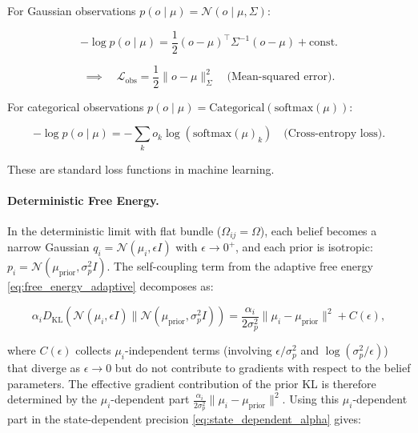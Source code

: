 \documentclass[twoside,11pt]{article}
\begin{document}
For Gaussian observations $p(o \mid \mu) = \mathcal{N}(o \mid \mu, \Sigma)$:

\begin{equation}
-\log p(o \mid \mu) = \frac{1}{2}(o - \mu)^\top \Sigma^{-1} (o - \mu) + \text{const.}
\end{equation}

\begin{equation}
\implies \quad \mathcal{L}_{\text{obs}} = \frac{1}{2}\|o - \mu\|^2_{\Sigma} \quad \text{(Mean-squared error)}.
\end{equation}

For categorical observations $p(o \mid \mu) = \mathrm{Categorical}(\mathrm{softmax}(\mu))$:

\begin{equation}
-\log p(o \mid \mu) = -\sum_k o_k \log(\mathrm{softmax}(\mu)_k) \quad \text{(Cross-entropy loss)}.
\end{equation}

These are standard loss functions in machine learning. 


\paragraph{Deterministic Free Energy.}

In the deterministic limit with flat bundle ($\Omega_{ij} = \Omega$), each belief becomes a narrow Gaussian $q_i = \mathcal{N}(\mu_i, \epsilon I)$ with $\epsilon \to 0^+$, and each prior is isotropic: $p_i = \mathcal{N}(\mu_{\text{prior}}, \sigma_p^2 I)$. The self-coupling term from the adaptive free energy \eqref{eq:free_energy_adaptive} decomposes as:

\begin{equation}
\alpha_i D_{\mathrm{KL}}(\mathcal{N}(\mu_i, \epsilon I) \| \mathcal{N}(\mu_{\text{prior}}, \sigma_p^2 I))
= \frac{\alpha_i}{2\sigma_p^2} \|\mu_i - \mu_{\text{prior}}\|^2 + C(\epsilon),
\end{equation}

where $C(\epsilon)$ collects $\mu_i$-independent terms (involving $\epsilon/\sigma_p^2$ and $\log(\sigma_p^2/\epsilon)$) that diverge as $\epsilon \to 0$ but do not contribute to gradients with respect to the belief parameters. The effective gradient contribution of the prior KL is therefore determined by the $\mu_i$-dependent part $\frac{\alpha_i}{2\sigma_p^2}\|\mu_i - \mu_{\text{prior}}\|^2$. Using this $\mu_i$-dependent part in the state-dependent precision \eqref{eq:state_dependent_alpha} gives:
\end{document}
